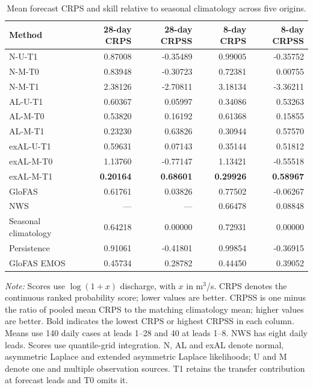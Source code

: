 \begin{table}[!htbp]
\centering
\begin{threeparttable}
\caption{Mean forecast CRPS and skill relative to seasonal climatology across five origins.}
\label{tab:external_benchmarks}
\setlength{\tabcolsep}{4pt}
\begin{tabular}{lrrrr}
\hline
Method & 28-day CRPS & 28-day CRPSS & 8-day CRPS & 8-day CRPSS \\
\hline
N-U-T1 & 0.87008 & -0.35489 & 0.99005 & -0.35752 \\
N-M-T0 & 0.83948 & -0.30723 & 0.72381 & 0.00755 \\
N-M-T1 & 2.38126 & -2.70811 & 3.18134 & -3.36211 \\
AL-U-T1 & 0.60367 & 0.05997 & 0.34086 & 0.53263 \\
AL-M-T0 & 0.53820 & 0.16192 & 0.61368 & 0.15855 \\
AL-M-T1 & 0.23230 & 0.63826 & 0.30944 & 0.57570 \\
exAL-U-T1 & 0.59631 & 0.07143 & 0.35144 & 0.51812 \\
exAL-M-T0 & 1.13760 & -0.77147 & 1.13421 & -0.55518 \\
exAL-M-T1 & \textbf{0.20164} & \textbf{0.68601} & \textbf{0.29926} & \textbf{0.58967} \\
GloFAS & 0.61761 & 0.03826 & 0.77502 & -0.06267 \\
NWS & --- & --- & 0.66478 & 0.08848 \\
Seasonal climatology & 0.64218 & 0.00000 & 0.72931 & 0.00000 \\
Persistence & 0.91061 & -0.41801 & 0.99854 & -0.36915 \\
GloFAS EMOS & 0.45734 & 0.28782 & 0.44450 & 0.39052 \\
\hline
\end{tabular}
\begin{tablenotes}\footnotesize
\item \textit{Note:} Scores use $\log(1+x)$ discharge, with $x$ in m$^3$/s. CRPS denotes the continuous ranked probability score; lower values are better. CRPSS is one minus the ratio of pooled mean CRPS to the matching climatology mean; higher values are better. Bold indicates the lowest CRPS or highest CRPSS in each column. Means use 140 daily cases at leads 1--28 and 40 at leads 1--8. NWS has eight daily leads. Scores use quantile-grid integration. N, AL and exAL denote normal, asymmetric Laplace and extended asymmetric Laplace likelihoods; U and M denote one and multiple observation sources. T1 retains the transfer contribution at forecast leads and T0 omits it.
\end{tablenotes}
\end{threeparttable}
\end{table}
